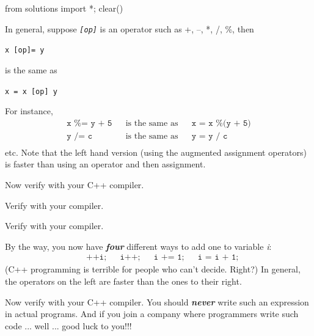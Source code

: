 \begin{python0}
from solutions import *; clear()
\end{python0}





In general, suppose \emph{\texttt{[op]}} is an operator such as +, --, *, /,
\%, then
\begin{center}
\texttt{x [op]= y}
\end{center}
is the same as
\begin{center}
\texttt{x = x [op] y}
\end{center}
For instance,
\begin{align*}
\texttt{x \%= y + 5} && \text{is the same as} && \texttt{x = x \% (y + 5)}\\
\texttt{y /= c} && \text{is the same as} && \texttt{y = y / c}\\
\end{align*}
etc. Note that the left hand version (using the augmented assignment
operators) is faster than using an operator and then assignment.


Now verify with your C++ compiler.


Verify with your compiler.



Verify with your compiler.



By the way, you now have \emph{\textbf{four}} different ways to add one
to variable \emph{i}:
\begin{align*}
&\texttt{++i;} &&\texttt{i++;} &&\texttt{i += 1;} &&\texttt{i = i + 1;}
\end{align*}
(C++ programming is terrible for people who can't decide. Right?) In general, the operators on the left are faster than the ones to their right.







Now verify with your C++ compiler. You should \emph{\textbf{never}} write such an expression in actual programs. And if you join a company where programmers write such code ... well ... good luck to you!!!





